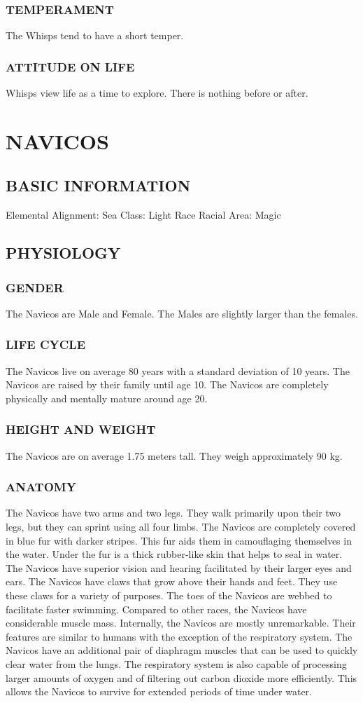 \subsubsection{TEMPERAMENT}
The Whisps tend to have a short temper.
\subsubsection{ATTITUDE ON LIFE}
Whisps view life as a time to explore.  There is nothing before or after.
\section{NAVICOS}
\subsection{BASIC INFORMATION}
Elemental Alignment: Sea
Class: Light Race
Racial Area: Magic
\subsection{PHYSIOLOGY}
\subsubsection{GENDER}
The Navicos are Male and Female.  The Males are slightly larger than the females.
\subsubsection{LIFE CYCLE}
The Navicos live on average 80 years with a standard deviation of 10 years.  The Navicos are raised by their family until age 10.  The Navicos are completely physically and mentally mature around age 20.
\subsubsection{HEIGHT AND WEIGHT}
The Navicos are on average 1.75 meters tall.  They weigh approximately 90 kg.
\subsubsection{ANATOMY}
The Navicos have two arms and two legs.  They walk primarily upon their two legs, but they can sprint using all four limbs. The Navicos are completely covered in blue fur with darker stripes.  This fur aids them in camouflaging themselves in the water.  Under the fur is a thick rubber-like skin that helps to seal in water.  The Navicos have superior vision and hearing facilitated by their larger eyes and ears.  The Navicos have claws that grow above their hands and feet.  They use these claws for a variety of purposes.  The toes of the Navicos are webbed to facilitate faster swimming. Compared to other races, the Navicos have considerable muscle mass. Internally, the Navicos are mostly unremarkable.  Their features are similar to humans with the exception of the respiratory system.  The Navicos have an additional pair of diaphragm muscles that can be used to quickly clear water from the lungs.  The respiratory system is also capable of processing larger amounts of oxygen and of filtering out carbon dioxide more efficiently.  This allows the Navicos to survive for extended periods of time under water.
